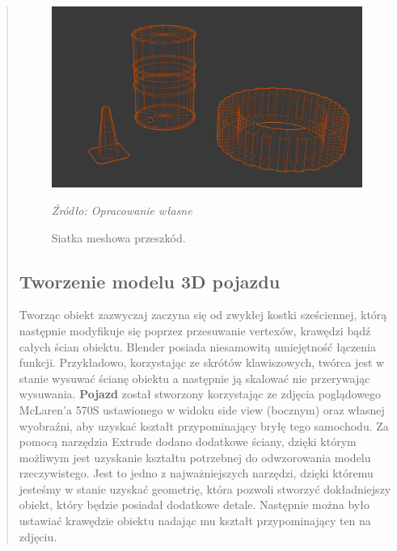 \begin{quotation}
\begin{figure}[!hbt]
\centering
  \includegraphics[width=1\linewidth]{wireframe.png}
  \caption{Siatka meshowa przeszkód.}\label{rys_9}
  \begin{minipage}[t]{0.75\linewidth}
    \emph{Źródło: Opracowanie własne}
  \end{minipage}
\end{figure}

\newpage
\subsection{Tworzenie modelu 3D pojazdu}
\indent Tworząc obiekt zazwyczaj zaczyna się od zwykłej kostki sześciennej, którą następnie modyfikuje się poprzez przesuwanie vertexów, krawędzi bądź całych ścian obiektu. Blender posiada niesamowitą umiejętność łączenia funkcji. Przykładowo, korzystając ze skrótów klawiszowych, twórca jest w stanie wysuwać ścianę obiektu a następnie ją skalować nie przerywając wysuwania. \textbf{Pojazd} został stworzony korzystając ze zdjęcia poglądowego McLaren'a 570S ustawionego w widoku side view (bocznym) oraz własnej wyobraźni, aby uzyskać kształt przypominający bryłę tego samochodu. Za pomocą narzędzia Extrude dodano dodatkowe ściany, dzięki którym możliwym jest uzyskanie kształtu potrzebnej do odwzorowania modelu rzeczywistego. Jest to jedno z najważniejszych narzędzi, dzięki któremu jesteśmy w stanie uzyskać geometrię, która pozwoli stworzyć dokładniejszy obiekt, który będzie posiadał dodatkowe detale. Następnie można było ustawiać krawędzie obiektu nadając mu kształt przypominający ten na zdjęciu.


\end{quotation}
